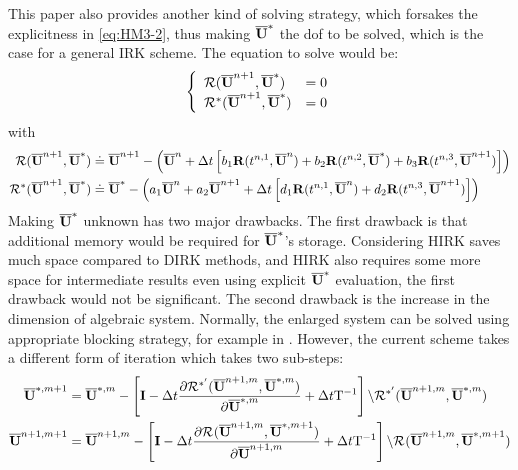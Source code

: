 \documentclass[preprint,12pt]{elsarticle}
\begin{document}
This paper also provides another kind of
solving strategy,
which forsakes the explicitness in \eqref{eq:HM3-2},
thus making $\overline{\mathbf{U}}^*$ the dof to be solved,
which is the case for a general IRK scheme.
The equation to solve would be:
\begin{equation}
    \begin{aligned}
                                  & \left\{
        \begin{array}[2]{ll}
            \Res(\uu^{n+1},\uu^{*})   & = 0 \\
            \Res^*(\uu^{n+1},\uu^{*}) & = 0 \\
        \end{array}
        \right.                                               \\
    \end{aligned}
\end{equation}
with
\begin{equation}
    \begin{aligned}
        \mathcal{R}(\overline{\mathbf{U}}^{n+1},\overline{\mathbf{U}}^{*})   & \doteq \overline{\mathbf{U}}^{n+1} - \left(
        \overline{\mathbf{U}}^{n} +
        \mathrm\Delta t
        \left[
            b_1\mathbf{R}(t^{n,1}, \overline{\mathbf{U}}^n) +
            b_2\mathbf{R}(t^{n,2}, \overline{\mathbf{U}}^*) +
            b_3\mathbf{R}(t^{n,3}, \overline{\mathbf{U}}^{n+1})
            \right]
        \right)                                               \\
        \mathcal{R}^*(\overline{\mathbf{U}}^{n+1},\overline{\mathbf{U}}^{*}) & \doteq\overline{\mathbf{U}}^{*} - \left(
        a_1\overline{\mathbf{U}}^{n} +
        a_2\overline{\mathbf{U}}^{n+1} +
        \mathrm\Delta t
        \left[
            d_1\mathbf{R}(t^{n,1}, \overline{\mathbf{U}}^n) +
            d_2\mathbf{R}(t^{n,3}, \overline{\mathbf{U}}^{n+1})
            \right]
        \right)
    \end{aligned}
\end{equation}
Making $\overline{\mathbf{U}}^*$ unknown has two major drawbacks.
The first drawback is that additional memory
would be required for $\overline{\mathbf{U}}^*$'s storage.
Considering HIRK saves much space compared to
DIRK methods, and HIRK also requires some more space
for intermediate results even using explicit $\overline{\mathbf{U}}^*$ evaluation,
the first drawback would not be significant.
The second drawback is the increase in the dimension of
algebraic system.
Normally, the enlarged system can be solved
using appropriate blocking strategy,
for example in \cite{pazner2017stage}.
However, the current scheme takes a different form of
iteration which takes two sub-steps:
\begin{equation}
    \label{eq:intersolve}
    \begin{aligned}
        \overline{\mathbf{U}}^{*,m+1}   & = \overline{\mathbf{U}}^{*,m} - \left[
            \mathbf{I} - \mathrm\Delta t \frac{\partial \mathcal{R}^{*'}(\overline{\mathbf{U}}^{n+1,m},\overline{\mathbf{U}}^{*,m})}
            {\partial \overline{\mathbf{U}}^{*,m}}
            + \mathrm\Delta t \mathrm{T}^{-1}
            \right]
        \backslash \mathcal{R}^{*'}(\overline{\mathbf{U}}^{n+1,m},\overline{\mathbf{U}}^{*,m}) \\
        \overline{\mathbf{U}}^{n+1,m+1} & = \overline{\mathbf{U}}^{n+1,m} - \left[
            \mathbf{I} - \mathrm\Delta t \frac{\partial \mathcal{R}^{}(\overline{\mathbf{U}}^{n+1,m},\overline{\mathbf{U}}^{*,m+1})}
            {\partial \overline{\mathbf{U}}^{n+1,m}}
            + \mathrm\Delta t \mathrm{T}^{-1}
            \right]
        \backslash \mathcal{R}^{}(\overline{\mathbf{U}}^{n+1,m},\overline{\mathbf{U}}^{*,m+1}) \\
    \end{aligned}
\end{equation}
\end{document}
